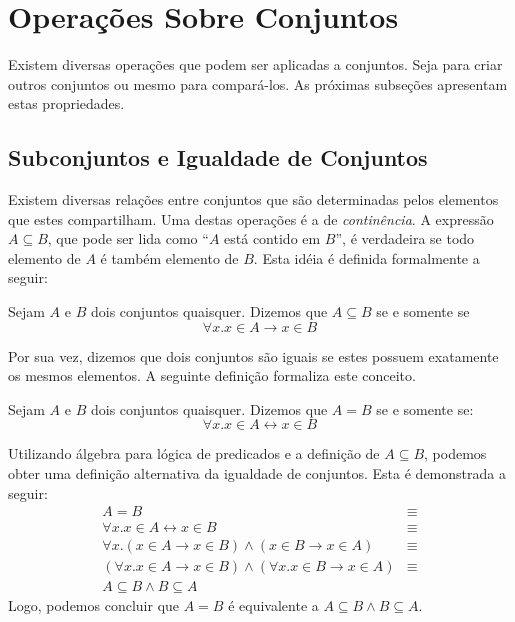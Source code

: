 \section{Operações Sobre Conjuntos}

Existem diversas operações que podem ser aplicadas a conjuntos. Seja
para criar outros conjuntos ou mesmo para compará-los. As próximas
subseções apresentam estas propriedades.

\subsection{Subconjuntos e Igualdade de Conjuntos}

Existem diversas relações entre conjuntos que são determinadas pelos
elementos que estes compartilham. Uma destas operações é a de
\emph{continência}. A expressão $A\subseteq B$, que  pode ser lida
como ``$A$ está contido em $B$'', é verdadeira se todo elemento de $A$
é também elemento de $B$. Esta idéia é definida formalmente a seguir:
\begin{Definition}[Continência]
Sejam $A$ e $B$ dois conjuntos quaisquer. Dizemos que $A \subseteq B$
se e somente se
\[\forall x. x\in A \to x \in B\]
\end{Definition}

Por sua vez, dizemos que dois conjuntos são iguais se estes possuem
exatamente os mesmos elementos. A seguinte definição formaliza este
conceito.

\begin{Definition}[Igualdade]
Sejam $A$ e $B$ dois conjuntos quaisquer. Dizemos que $A = B$ se e
somente se:
\[
\forall x. x\in A \leftrightarrow x \in B
\]
\end{Definition}
Utilizando álgebra para lógica de predicados e a definição de $A
\subseteq B$, podemos obter uma definição alternativa da igualdade de
conjuntos. Esta é demonstrada a seguir:
\[
\begin{array}{lc}
A = B & \equiv \\
\forall x. x \in A \leftrightarrow x \in B & \equiv\\
\forall x. (x\in A \to x \in B) \land (x \in B \to x \in A) & \equiv\\
(\forall x. x\in A \to x \in B) \land (\forall x . x\in B \to x \in A)
& \equiv\\
A\subseteq B\land B \subseteq A
\end{array}
\]
Logo, podemos concluir que $A = B$ é equivalente a $A \subseteq B
\land B\subseteq A$.

